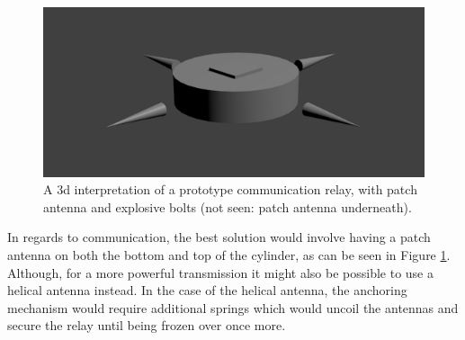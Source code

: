 \begin{figure}[!ht]
	\begin{center}
		\includegraphics[width=0.7\columnwidth]{figures/JP/comms_relay.png}
		\caption{A 3d interpretation of a prototype communication relay, with patch antenna and explosive bolts (not seen: patch antenna underneath).\label{fig:comms_relay}}
	\end{center}
\end{figure}

In regards to communication, the best solution would involve having a patch antenna on both the bottom and top of the cylinder, as can be seen in Figure \ref{fig:comms_relay}. Although, for a more powerful transmission it might also be possible to use a helical antenna instead. In the case of the helical antenna, the anchoring mechanism would require additional springs which would uncoil the antennas and secure the relay until being frozen over once more.

